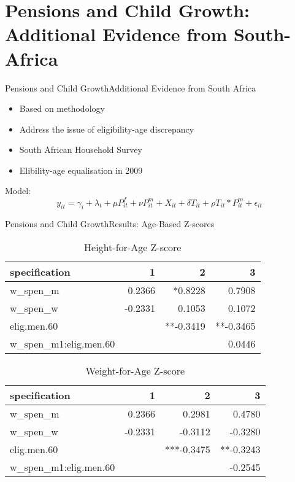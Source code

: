 \documentclass{beamer}
\begin{document}
\section[Pensions, Child Growth]{Pensions and Child Growth: Additional Evidence from South-Africa}

\begin{frame}{Pensions and Child Growth}{Additional Evidence from South Africa}
	\begin{itemize}
		\item Based on  \parencite{duflo2000child,duflo2003grandmothers} methodology
		\item Address the issue of eligibility-age discrepancy
		\item South African Household Survey \parencite{saldru2008nids,saldru2012nids,saldru2013nids}
		\item Elibility-age equalisation in 2009
	\end{itemize}
	Model:
	\setcounter{equation}{2}
	\begin{equation}
		\label{sa:eq:interaction}
		y_{it} = \gamma_i + \lambda_t + \mu P^f_{it} + \nu P^m_{it} + X_{it} + \delta T_{it} + \rho T_{it}*P^m_{it} + \epsilon_{it}
		\end{equation}
\end{frame}

\begin{frame}{Pensions and Child Growth}{Results: Age-Based Z-scores}
	\begin{table}[!ht]
	\centering
	\caption{Height-for-Age Z-score}
	\label{sa:ta:haz}
		\begin{tabular}{l|rrr}
		\hline
		specification & 1 & 2 & 3\\
		\hline
		w\_spen\_m & 0.2366 & *0.8228 & 0.7908 \\
		w\_spen\_w & -0.2331 & 0.1053 & 0.1072 \\
		elig.men.60 & & **-0.3419 & **-0.3465 \\
		w\_spen\_m1:elig.men.60 & & & 0.0446 \\
		\end{tabular}
	\end{table}
	\begin{table}[!ht]
	\centering
	\caption{Weight-for-Age Z-score}
	\label{sa:ta:waz}
	\begin{tabular}{l|rrr}
		\hline
		specification & 1 & 2 & 3\\
		\hline
		w\_spen\_m & 0.2366 & 0.2981 & 0.4780 \\
		w\_spen\_w & -0.2331 & -0.3112 & -0.3280 \\
		elig.men.60 & & ***-0.3475 & **-0.3243 \\
		w\_spen\_m1:elig.men.60 & & & -0.2545 \\
		\end{tabular}
	\end{table}	
\end{frame}
\end{document}
